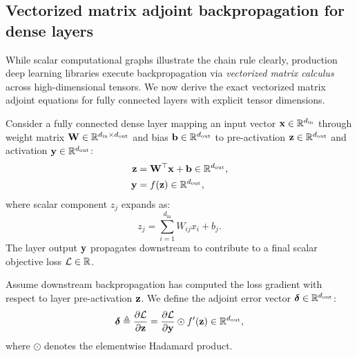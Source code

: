 \documentclass[../../main.tex]{subfiles}
\begin{document}
\subsection{Vectorized matrix adjoint backpropagation for dense layers}
\label{subsec:vectorized_backprop}

While scalar computational graphs illustrate the chain rule clearly, production deep learning libraries execute backpropagation via \emph{vectorized matrix calculus} across high-dimensional tensors. We now derive the exact vectorized matrix adjoint equations for fully connected layers with explicit tensor dimensions.

Consider a fully connected dense layer mapping an input vector $\mathbf{x} \in \mathbb{R}^{d_{\text{in}}}$ through weight matrix $\mathbf{W} \in \mathbb{R}^{d_{\text{in}} \times d_{\text{out}}}$ and bias $\mathbf{b} \in \mathbb{R}^{d_{\text{out}}}$ to pre-activation $\mathbf{z} \in \mathbb{R}^{d_{\text{out}}}$ and activation $\mathbf{y} \in \mathbb{R}^{d_{\text{out}}}$:
\begin{align}
\mathbf{z} &= \mathbf{W}^\top \mathbf{x} + \mathbf{b} \in \mathbb{R}^{d_{\text{out}}}, \label{eq:vec_fwd_z} \\
\mathbf{y} &= f(\mathbf{z}) \in \mathbb{R}^{d_{\text{out}}}, \label{eq:vec_fwd_y}
\end{align}
where scalar component $z_j$ expands as:
\begin{equation}
z_j = \sum_{i=1}^{d_{\text{in}}} W_{ij} x_i + b_j.
\end{equation}
The layer output $\mathbf{y}$ propagates downstream to contribute to a final scalar objective loss $\mathcal{L} \in \mathbb{R}$.

Assume downstream backpropagation has computed the loss gradient with respect to layer pre-activation $\mathbf{z}$. We define the adjoint error vector $\bm{\delta} \in \mathbb{R}^{d_{\text{out}}}$:
\begin{equation}
\label{eq:delta_adjoint_def}
\bm{\delta} \triangleq \frac{\partial \mathcal{L}}{\partial \mathbf{z}} = \frac{\partial \mathcal{L}}{\partial \mathbf{y}} \odot f'(\mathbf{z}) \in \mathbb{R}^{d_{\text{out}}},
\end{equation}
where $\odot$ denotes the elementwise Hadamard product.
\end{document}
